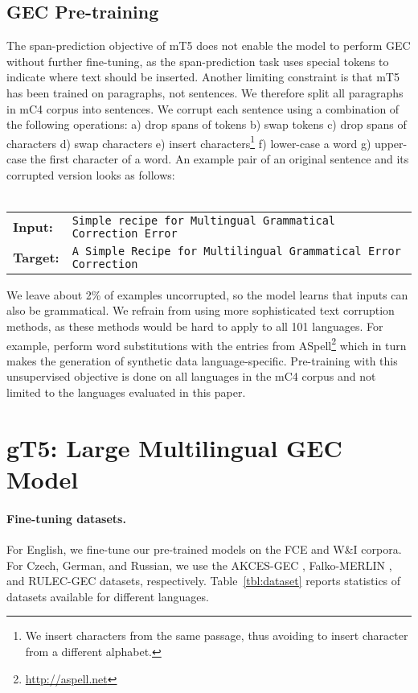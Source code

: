 \documentclass[11pt,a4paper]{article}
\newcommand{\GT}[0]{{gT5}\xspace}
\begin{document}
\subsection{GEC Pre-training}\label{gec-pre-training}
The span-prediction objective of mT5 does not enable the model to perform GEC without further fine-tuning, as the span-prediction task uses  special  tokens  to  indicate  where  text should be inserted.
Another limiting constraint is that  mT5 has  been trained on paragraphs, not sentences.
We therefore split all paragraphs in mC4 corpus into sentences.
We corrupt each sentence using a combination of the following operations:
a) drop spans of tokens b) swap tokens c) drop spans of characters d) swap characters e) insert characters\footnote{We insert characters from the same passage, thus avoiding to insert character from a different alphabet.} f) lower-case a word g) upper-case the first character of a word.
An example pair of an original sentence and its corrupted version looks as follows: \\
\\
{\footnotesize
\setlength{\parindent}{3pt}
\begin{tabularx}{\columnwidth}{lX}
\textbf{Input:} &
\texttt{Simple recipe for Multingual Grammatical Correction Error} \\[1.3em]
\textbf{Target:} &
\texttt{A Simple Recipe for Multilingual Grammatical Error Correction}
\\[1em]
\end{tabularx}
}

{\setlength{\parindent}{0pt}
We leave about 2\% of examples uncorrupted, so the model learns that inputs can also be grammatical.}
We refrain from using more sophisticated text corruption methods, as these methods would be hard to apply to all 101 languages.
For example, \citet{naplava} perform word substitutions with the entries from ASpell\footnote{\url{http://aspell.net}} which in turn makes the generation of synthetic data language-specific.
Pre-training with this unsupervised objective is done on all languages in the mC4 corpus and not limited to the languages evaluated in this paper.

\section{\GT: Large Multilingual GEC Model} 
\paragraph*{Fine-tuning datasets.}\label{fine-tuning-data}
For English, we fine-tune our pre-trained models on the FCE \citep{fcedataset} and W\&I \citep{bea-2019} corpora.
For Czech, German, and Russian, we use the AKCES-GEC \citep{naplava}, Falko-MERLIN \citep{boyd-2018}, and RULEC-GEC \citep{rozovskaya-roth-2019-grammar} datasets, respectively. Table~\ref{tbl:dataset} reports statistics of datasets available for different languages.
\end{document}
